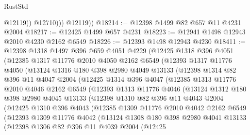 \begin{lexlean}{RustStd}
\begin{coremodule}
                  @12119))
              @12710)))
        @12119))
@18214 := @12398 @1499 @82 @657 @11 @4231 @2004
@18217 := @12425 @1499 @657 @4231
@18223 := @12941 @1498 @12943 @2010 @4230 @2162 @6549
@18226 := @12393 @1498 @12943 @4230
@18411 := @12398
    @1318
    @1497
    @396
    @659
    @4051
    @4229
    (@12425
      @1318
      @396
      @4051
      (@12385
        @1317
        @11776
        @2010
        @4050
        @2162
        @6549
        (@12393
          @1317
          @11776
          @4050
          (@13124
            @1316
            @180
            @398
            @2980
            @4049
            @13133
            (@12398
              @1314
              @82
              @396
              @11
              @4047
              @2004
              (@12425
                @1314
                @396
                @4047
                (@12385
                  @1313
                  @11776
                  @2010
                  @4046
                  @2162
                  @6549
                  (@12393
                    @1313
                    @11776
                    @4046
                    (@13124
                      @1312
                      @180
                      @398
                      @2980
                      @4045
                      @13133
                      (@12398
                        @1310
                        @82
                        @396
                        @11
                        @4043
                        @2004
                        (@12425
                          @1310
                          @396
                          @4043
                          (@12385
                            @1309
                            @11776
                            @2010
                            @4042
                            @2162
                            @6549
                            (@12393
                              @1309
                              @11776
                              @4042
                              (@13124
                                @1308
                                @180
                                @398
                                @2980
                                @4041
                                @13133
                                (@12398
                                  @1306
                                  @82
                                  @396
                                  @11
                                  @4039
                                  @2004
                                  (@12425

\end{coremodule}
\end{lexlean}
